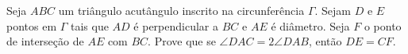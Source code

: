 Seja $ABC$ um triângulo acutângulo inscrito na circunferência $\Gamma$. 
Sejam $D$ e $E$ pontos em $\Gamma$ tais que $AD$ é perpendicular a $BC$ e $AE$ é diâmetro.
Seja $F$ o ponto de interseção de $AE$ com $BC$.
Prove que se $\angle DAC = 2 \angle DAB$, então $DE = CF$.